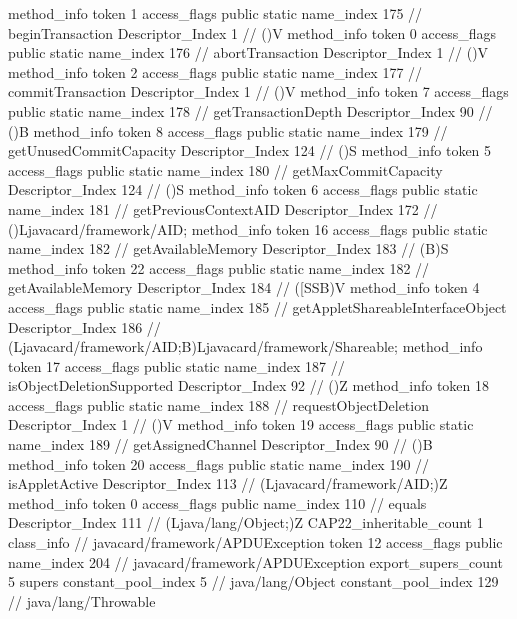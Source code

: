 {{{{{				}
				method_info {
					token	1
					access_flags	public static
					name_index	175		// beginTransaction
					Descriptor_Index	1		// ()V
				}
				method_info {
					token	0
					access_flags	public static
					name_index	176		// abortTransaction
					Descriptor_Index	1		// ()V
				}
				method_info {
					token	2
					access_flags	public static
					name_index	177		// commitTransaction
					Descriptor_Index	1		// ()V
				}
				method_info {
					token	7
					access_flags	public static
					name_index	178		// getTransactionDepth
					Descriptor_Index	90		// ()B
				}
				method_info {
					token	8
					access_flags	public static
					name_index	179		// getUnusedCommitCapacity
					Descriptor_Index	124		// ()S
				}
				method_info {
					token	5
					access_flags	public static
					name_index	180		// getMaxCommitCapacity
					Descriptor_Index	124		// ()S
				}
				method_info {
					token	6
					access_flags	public static
					name_index	181		// getPreviousContextAID
					Descriptor_Index	172		// ()Ljavacard/framework/AID;
				}
				method_info {
					token	16
					access_flags	public static
					name_index	182		// getAvailableMemory
					Descriptor_Index	183		// (B)S
				}
				method_info {
					token	22
					access_flags	public static
					name_index	182		// getAvailableMemory
					Descriptor_Index	184		// ([SSB)V
				}
				method_info {
					token	4
					access_flags	public static
					name_index	185		// getAppletShareableInterfaceObject
					Descriptor_Index	186		// (Ljavacard/framework/AID;B)Ljavacard/framework/Shareable;
				}
				method_info {
					token	17
					access_flags	public static
					name_index	187		// isObjectDeletionSupported
					Descriptor_Index	92		// ()Z
				}
				method_info {
					token	18
					access_flags	public static
					name_index	188		// requestObjectDeletion
					Descriptor_Index	1		// ()V
				}
				method_info {
					token	19
					access_flags	public static
					name_index	189		// getAssignedChannel
					Descriptor_Index	90		// ()B
				}
				method_info {
					token	20
					access_flags	public static
					name_index	190		// isAppletActive
					Descriptor_Index	113		// (Ljavacard/framework/AID;)Z
				}
				method_info {
					token	0
					access_flags	public
					name_index	110		// equals
					Descriptor_Index	111		// (Ljava/lang/Object;)Z
				}
			}
			CAP22_inheritable_count	1
		}
		class_info {		// javacard/framework/APDUException
			token	12
			access_flags	public
			name_index	204		// javacard/framework/APDUException
			export_supers_count	5
			supers {
				constant_pool_index	5		// java/lang/Object
				constant_pool_index	129		// java/lang/Throwable
}}}}
